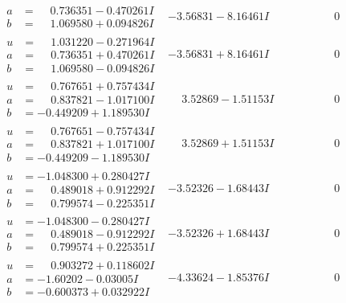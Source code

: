 \documentclass[1p]{elsarticle_modified}
\theoremstyle{definition}
\begin{document}
$$\begin{array}{c|c|c}
\begin{aligned}
a &= \phantom{-}0.736351 - 0.470261 I \\
b &= \phantom{-}1.069580 + 0.094826 I\end{aligned}
 & -3.56831 - 8.16461 I & \phantom{-0.000000 } 0 \\ \hline\begin{aligned}
u &= \phantom{-}1.031220 - 0.271964 I \\
a &= \phantom{-}0.736351 + 0.470261 I \\
b &= \phantom{-}1.069580 - 0.094826 I\end{aligned}
 & -3.56831 + 8.16461 I & \phantom{-0.000000 } 0 \\ \hline\begin{aligned}
u &= \phantom{-}0.767651 + 0.757434 I \\
a &= \phantom{-}0.837821 - 1.017100 I \\
b &= -0.449209 + 1.189530 I\end{aligned}
 & \phantom{-}3.52869 - 1.51153 I & \phantom{-0.000000 } 0 \\ \hline\begin{aligned}
u &= \phantom{-}0.767651 - 0.757434 I \\
a &= \phantom{-}0.837821 + 1.017100 I \\
b &= -0.449209 - 1.189530 I\end{aligned}
 & \phantom{-}3.52869 + 1.51153 I & \phantom{-0.000000 } 0 \\ \hline\begin{aligned}
u &= -1.048300 + 0.280427 I \\
a &= \phantom{-}0.489018 + 0.912292 I \\
b &= \phantom{-}0.799574 - 0.225351 I\end{aligned}
 & -3.52326 - 1.68443 I & \phantom{-0.000000 } 0 \\ \hline\begin{aligned}
u &= -1.048300 - 0.280427 I \\
a &= \phantom{-}0.489018 - 0.912292 I \\
b &= \phantom{-}0.799574 + 0.225351 I\end{aligned}
 & -3.52326 + 1.68443 I & \phantom{-0.000000 } 0 \\ \hline\begin{aligned}
u &= \phantom{-}0.903272 + 0.118602 I \\
a &= -1.60202 - 0.03005 I \\
b &= -0.600373 + 0.032922 I\end{aligned}
 & -4.33624 - 1.85376 I & \phantom{-0.000000 } 0 \\ \hline\begin{aligned}

\end{aligned}
\end{array}$$
\end{document}
